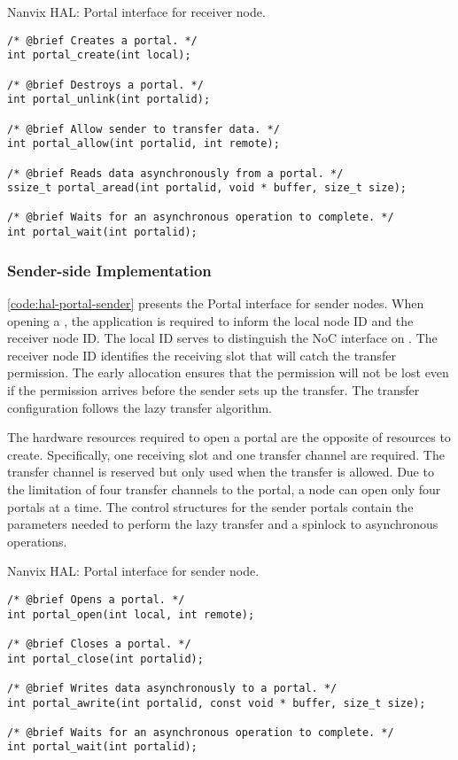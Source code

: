 \begin{listing}[!tb]
\caption{Nanvix HAL: Portal interface for receiver node.}
\label{code:hal-portal-receiver}
\begin{verbatim}
/* @brief Creates a portal. */
int portal_create(int local);

/* @brief Destroys a portal. */
int portal_unlink(int portalid);

/* @brief Allow sender to transfer data. */
int portal_allow(int portalid, int remote);

/* @brief Reads data asynchronously from a portal. */
ssize_t portal_aread(int portalid, void * buffer, size_t size);

/* @brief Waits for an asynchronous operation to complete. */
int portal_wait(int portalid);
\end{verbatim}
\end{listing}

			\subsubsection{Sender-side Implementation}

				\autoref{code:hal-portal-sender} presents the Portal interface for
				sender nodes. When opening a \portal, the application is required to
				inform the local node ID and the receiver node ID. The local ID serves
				to distinguish the NoC interface on \ioclusters. The receiver node ID
				identifies the \cnoc receiving slot that will catch the transfer
				permission. The early allocation ensures that the permission will not
				be lost even if the permission arrives before the sender sets up the
				transfer. The transfer configuration follows the lazy transfer algorithm.

				The hardware resources required to open a portal are the opposite of
				resources to create. Specifically, one \cnoc receiving slot and one
				\dnoc transfer channel are required. The transfer channel is reserved
				but only used when the transfer is allowed. Due to the limitation of
				four transfer channels to the portal, a node can open only four portals
				at a time. The control structures for the sender portals contain the
				parameters needed to perform the lazy transfer and a spinlock to
				asynchronous operations.

\begin{listing}[!tb]
\caption{Nanvix HAL: Portal interface for sender node.}
\label{code:hal-portal-sender}
\begin{verbatim}
/* @brief Opens a portal. */
int portal_open(int local, int remote);

/* @brief Closes a portal. */
int portal_close(int portalid);

/* @brief Writes data asynchronously to a portal. */
int portal_awrite(int portalid, const void * buffer, size_t size);

/* @brief Waits for an asynchronous operation to complete. */
int portal_wait(int portalid);
\end{verbatim}
\end{listing}


